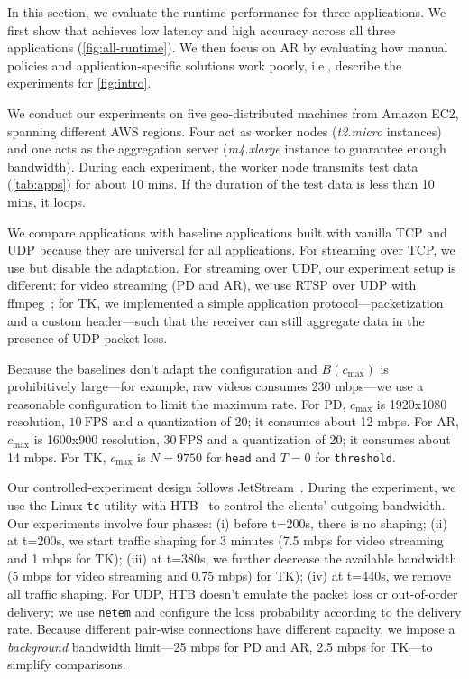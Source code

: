 In this section, we evaluate the runtime performance for three applications. We
first show that \sysname{} achieves low latency and high accuracy across all
three applications (\autoref{fig:all-runtime}).
We then focus on AR by evaluating how manual policies and
application-specific solutions work poorly, i.e., describe the experiments for
\autoref{fig:intro}.

We conduct our experiments on five geo-distributed machines from Amazon EC2,
spanning different AWS regions. Four act as worker nodes (\textit{t2.micro}
instances) and one acts as the aggregation server (\textit{m4.xlarge} instance
to guarantee enough bandwidth). During each experiment, the worker node
transmits test data (\autoref{tab:apps}) for about 10 mins. If the duration of
the test data is less than 10 mins, it loops.

We compare \sysname{} applications with baseline applications built with vanilla
TCP and UDP because they are universal for all applications. For streaming over
TCP, we use \sysname{} but disable the adaptation. For streaming over UDP, our
experiment setup is different: for video streaming (PD and AR), we use RTSP over
UDP with ffmpeg~\cite{bellard2012ffmpeg}; for TK, we implemented a simple
application protocol---packetization and a custom header---such that the receiver
can still aggregate data in the presence of UDP packet loss.

Because the baselines don't adapt the configuration and $B(c_{\max})$ is
prohibitively large---for example, raw videos consumes 230 mbps---we use a
reasonable configuration to limit the maximum rate. For PD, $c_{\max}$ is
1920x1080 resolution, \(10~\text{FPS}\) and a quantization of 20; it consumes about 12
mbps. For AR, $c_{\max}$ is 1600x900 resolution, \(30~\text{FPS}\) and a quantization of 20;
it consumes about 14 mbps.
For TK, $c_{\max}$ is $N=9750$ for \texttt{head} and $T=0$ for \texttt{threshold}.

Our controlled-experiment design follows JetStream~\cite{rabkin2014aggregation}. During
the experiment, we use the Linux \texttt{tc} utility with HTB~\cite{lartc,
  htb} to control the clients' outgoing bandwidth. Our experiments
involve four phases: (i) before t=200s, there is no shaping; (ii) at
t=200s, we start traffic shaping for 3 minutes (7.5 mbps for video
streaming and 1 mbps for TK); (iii) at t=380s, we further decrease the
available bandwidth (5 mbps for video streaming and 0.75 mbps) for TK);
(iv) at t=440s, we remove all traffic shaping. For UDP, HTB doesn't emulate the
packet loss or out-of-order delivery; we use \texttt{netem} and configure the
loss probability according to the delivery rate. Because different pair-wise
connections have different capacity, we impose a \textit{background} bandwidth
limit---25 mbps for PD and AR, 2.5 mbps for TK---to simplify comparisons.

